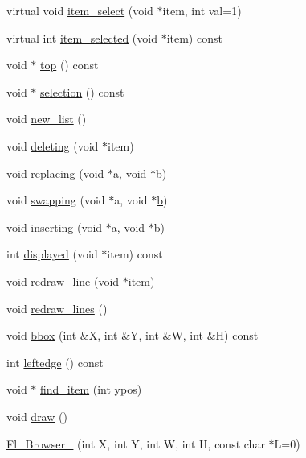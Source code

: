 \begin{DoxyCompactItemize}
\item 
virtual void \hyperlink{class_fl___browser___a81b34bf7d536207d3b049924ef491f3b}{item\+\_\+select} (void $\ast$item, int val=1)
\item 
virtual int \hyperlink{class_fl___browser___a05500ecd3d8da6f429117751829395c7}{item\+\_\+selected} (void $\ast$item) const
\item 
void $\ast$ \hyperlink{class_fl___browser___acf8856ddf092e7b00d9f6b381cc09b20}{top} () const
\item 
void $\ast$ \hyperlink{class_fl___browser___a0def0e61d7de24c2ebaa3dfa982232c1}{selection} () const
\item 
void \hyperlink{class_fl___browser___ac1aa2a6bed2109458ab8b701585dca9d}{new\+\_\+list} ()
\item 
void \hyperlink{class_fl___browser___a0e14ea8be60dc03d76124ed5d3a1b58d}{deleting} (void $\ast$item)
\item 
void \hyperlink{class_fl___browser___ac741e98e5af5630f9c693066ef2cc578}{replacing} (void $\ast$a, void $\ast$\hyperlink{forms_8_h_a0ba06a290a384fa06b1b90745827dae2}{b})
\item 
void \hyperlink{class_fl___browser___ae1ae1e4627efd74f6dfc7c9116648a49}{swapping} (void $\ast$a, void $\ast$\hyperlink{forms_8_h_a0ba06a290a384fa06b1b90745827dae2}{b})
\item 
void \hyperlink{class_fl___browser___a6ad26748441b4801ae10f55414e98f0a}{inserting} (void $\ast$a, void $\ast$\hyperlink{forms_8_h_a0ba06a290a384fa06b1b90745827dae2}{b})
\item 
int \hyperlink{class_fl___browser___afe38d875145818749f6e3c34059866ff}{displayed} (void $\ast$item) const
\item 
void \hyperlink{class_fl___browser___ac06f58d6aa13a432825231c19aba6544}{redraw\+\_\+line} (void $\ast$item)
\item 
void \hyperlink{class_fl___browser___a78e2b46f393546abbe22ec28e048f8de}{redraw\+\_\+lines} ()
\item 
void \hyperlink{class_fl___browser___a280d61654c588bc6a5602e4a65e321ca}{bbox} (int \&X, int \&Y, int \&W, int \&H) const
\item 
int \hyperlink{class_fl___browser___ab7be86a21c621edb7e5cbea6c30adb44}{leftedge} () const
\item 
void $\ast$ \hyperlink{class_fl___browser___a259e5042e07cae2f63884497affe562a}{find\+\_\+item} (int ypos)
\item 
void \hyperlink{class_fl___browser___af563481285289e2fc304ded1a0cbb49f}{draw} ()
\item 
\hyperlink{class_fl___browser___a88e6a3e490e8de7042d6c16b2888dfd3}{Fl\+\_\+\+Browser\+\_\+} (int X, int Y, int W, int H, const char $\ast$L=0)
\end{DoxyCompactItemize}
